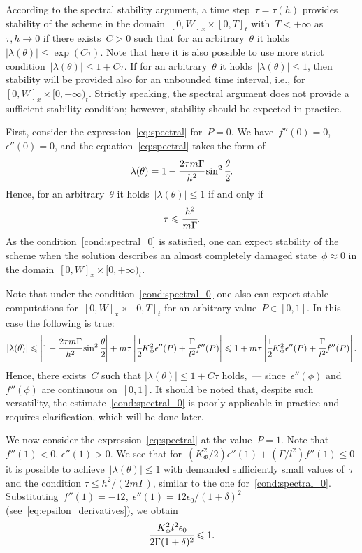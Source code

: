 According to the spectral stability argument, a time
step~$\tau = \tau(h)$ provides stability of the scheme in the
domain~$[0, W]_x \times [0, T]_t$ with~$T<+\infty$ as~$\tau, h \to 0$ if there
exists~$C > 0$ such that for an arbitrary~$\theta$ it
holds~$|\lambda(\theta)| \leqslant \exp(C\tau)$. Note that here it is
also possible to use more strict condition~$|\lambda(\theta)| \leqslant 1 + C\tau$.
If for an arbitrary~$\theta$ it holds~$|\lambda(\theta)| \leqslant 1$,
then stability will be provided also for an unbounded time interval, i.e.,
for~$[0, W]_x \times [0, +\infty)_t$.
Strictly speaking, the spectral argument does not provide a sufficient
stability condition; however, stability should be expected in practice.

First, consider the expression~\eqref{eq:spectral} for~$P=0$.
We have~$f''(0) = 0$, $\epsilon''(0) = 0$, and the equation~\eqref{eq:spectral}
takes the form of
$$\lambda(\theta) = 1 - \cfrac{2 \tau m \Gamma}{h^2} \sin^2 \cfrac{\theta}{2} {\text{.}}$$
Hence, for an arbitrary~$\theta$ it holds~$|\lambda(\theta)| \leqslant 1$
if and only if
\begin{equation}
  \tau \leqslant \cfrac{h^2}{m \Gamma} {\text{.}}
  \label{cond:spectral_0}
\end{equation}
As the condition~\eqref{cond:spectral_0} is satisfied, one can expect stability of the scheme
when the solution describes an almost completely damaged state~$\phi\approx0$
in the domain~$[0, W]_x \times [0, +\infty)_t$.

Note that under the condition~\eqref{cond:spectral_0} one also can expect stable computations
for~$[0, W]_x \times [0, T]_t$ for an arbitrary value~$P \in [0, 1]$.
In this case the following is true:
$$
|\lambda(\theta)| \leqslant \left| 1 - \cfrac{2 \tau m \Gamma}{h^2} \sin^2 \cfrac{\theta}{2} \right| + m \tau \left| \cfrac{1}{2} K_\Phi^2 \epsilon''(P) + \cfrac{\Gamma}{l^2} f''(P) \right| \leqslant 1 + m \tau \left| \cfrac{1}{2} K_\Phi^2 \epsilon''(P) + \cfrac{\Gamma}{l^2} f''(P) \right| {\text{.}}
$$
Hence, there exists~$C$ such that
$|\lambda(\theta)| \leqslant 1 + C \tau$ holds,~--- since~$\epsilon''(\phi)$ and~$f''(\phi)$
are continuous on~$[0, 1]$.
It should be noted that, despite such versatility, the estimate~\eqref{cond:spectral_0}
is poorly applicable in practice and requires clarification, which will be done later.

We now consider the expression~\eqref{eq:spectral} at the value~$P=1$.
Note that~$f''(1) < 0$, $\epsilon''(1) > 0$.
We see that for~$(K_\Phi^2 / 2) \epsilon''(1) + (\Gamma / l^2) f''(1) \leqslant 0$
it is possible to achieve~$|\lambda(\theta)| \leqslant 1$ with demanded sufficiently small
values of~$\tau$ and the condition $\tau \leqslant h^2 / (2m \Gamma)$,
similar to the one for~\eqref{cond:spectral_0}.
Substituting~$f''(1) = -12, \; \epsilon''(1) = 12 \epsilon_0 / (1 + \delta)^2$
(see~\eqref{eq:epsilon_derivatives}),
we obtain
\begin{equation}
  \cfrac{K_\Phi^2 l^2 \epsilon_0}{2 \Gamma (1 + \delta)^2} \leqslant 1 {\text{.}}
  \label{cond:spectral_possible_1}
\end{equation}

